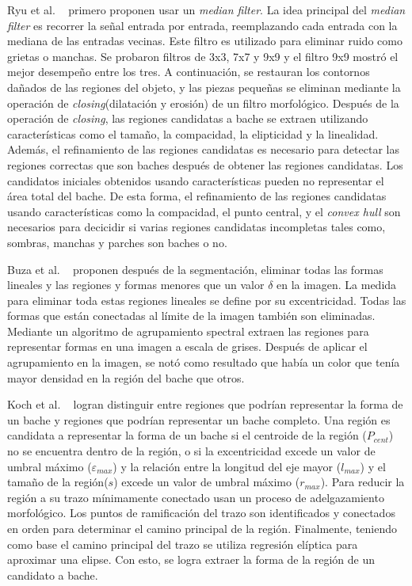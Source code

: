 		Ryu et al. ~ primero proponen usar un \emph{median filter}. La idea principal del \emph{median filter} es recorrer la señal 
		entrada por entrada, reemplazando cada entrada con la mediana de las entradas vecinas. Este filtro es utilizado para eliminar ruido como grietas o manchas. 
		Se probaron filtros de 3x3, 7x7 y 9x9 y el filtro 9x9 mostró el mejor desempeño entre los tres. A continuación, se restauran los contornos dañados de las 
		regiones del objeto, y las piezas pequeñas se eliminan mediante la operación de \emph{closing}(dilatación y erosión) de un filtro morfológico. Después de la operación 
		de \emph{closing}, las regiones candidatas a bache se extraen utilizando características como el tamaño, la compacidad, la elipticidad
		y la linealidad. Además, el refinamiento de las regiones candidatas es necesario para detectar las regiones correctas que son baches después de obtener las regiones 
		candidatas. Los candidatos iniciales obtenidos usando características pueden no representar el área total del bache. De esta forma, el refinamiento de las 
		regiones candidatas usando características como la compacidad, el punto central, y el \emph{convex hull} son necesarios para decicidir 
		si varias regiones candidatas incompletas tales como, sombras, manchas y parches son baches o no.

		Buza et al. ~ proponen después de la segmentación, eliminar todas las formas lineales  y las regiones y formas 
		menores que un valor $\delta$ en la imagen. La medida para eliminar toda estas regiones lineales se define por su excentricidad. Todas 
		las formas que están conectadas al límite de la imagen también son eliminadas. Mediante un algoritmo de agrupamiento spectral extraen 
		las regiones para representar formas en una imagen a escala de grises. Después de aplicar  el agrupamiento en la imagen,  
		se notó como resultado que había un color que tenía mayor densidad en la región del bache que otros.

		Koch et al. ~ logran distinguir entre regiones que podrían representar la forma de un bache y 
		regiones que podrían representar un bache completo. Una región es candidata a representar la forma de un bache si 
		el centroide de la región ($P_{cent}$) no se encuentra dentro de la región, o si la excentricidad excede un valor de umbral 
		máximo ($\varepsilon_{max}$) y la relación entre la longitud del eje mayor ($l_{max}$) y el tamaño de la región($s$) excede
		un valor de umbral máximo ($r_{max}$). Para reducir la región a su trazo  mínimamente conectado usan un proceso
		de adelgazamiento morfológico. Los puntos de ramificación del trazo son identificados y conectados en orden para 
		determinar el camino principal de la región. Finalmente, teniendo como base el camino principal del trazo 
		se utiliza regresión elíptica para aproximar una elipse. Con esto, se logra extraer la forma de la región de un 
		candidato a bache.

